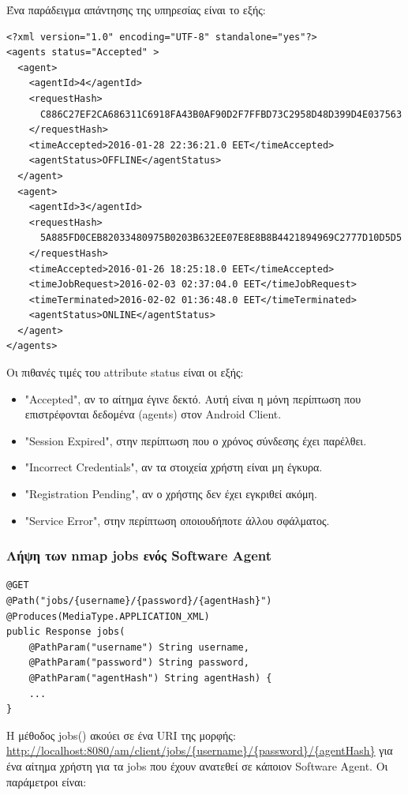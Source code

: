 \documentclass[a4paper,11pt]{article}
\begin{document}
\begin{sloppypar}
\begin{itemize}
\end{itemize}
Ένα παράδειγμα απάντησης της υπηρεσίας είναι το εξής:
\newpage


\begin{lstlisting}
<?xml version="1.0" encoding="UTF-8" standalone="yes"?>
<agents status="Accepted" >
  <agent>
    <agentId>4</agentId>
    <requestHash>
      C886C27EF2CA686311C6918FA43B0AF90D2F7FFBD73C2958D48D399D4E037563
    </requestHash>
    <timeAccepted>2016-01-28 22:36:21.0 EET</timeAccepted>
    <agentStatus>OFFLINE</agentStatus>
  </agent>
  <agent>
    <agentId>3</agentId>
    <requestHash>
      5A885FD0CEB82033480975B0203B632EE07E8E8B8B4421894969C2777D10D5D5
    </requestHash>
    <timeAccepted>2016-01-26 18:25:18.0 EET</timeAccepted>
    <timeJobRequest>2016-02-03 02:37:04.0 EET</timeJobRequest>
    <timeTerminated>2016-02-02 01:36:48.0 EET</timeTerminated>
    <agentStatus>ONLINE</agentStatus>
  </agent>
</agents>
\end{lstlisting}
Οι πιθανές τιμές του attribute status είναι οι εξής:
\begin{itemize}
\item "Accepted", αν το αίτημα έγινε δεκτό. Αυτή είναι η μόνη περίπτωση που επιστρέφονται δεδομένα (agents) στον Android Client.
\item "Session Expired", στην περίπτωση που ο χρόνος σύνδεσης έχει παρέλθει.
\item "Incorrect Credentials", αν τα στοιχεία χρήστη είναι μη έγκυρα.
\item "Registration Pending", αν ο χρήστης δεν έχει εγκριθεί ακόμη.
\item "Service Error", στην περίπτωση οποιουδήποτε άλλου σφάλματος.
\end{itemize}

\subsubsection{Λήψη των nmap jobs ενός Software Agent}
\begin{lstlisting}
@GET
@Path("jobs/{username}/{password}/{agentHash}")
@Produces(MediaType.APPLICATION_XML)
public Response jobs(
    @PathParam("username") String username,
    @PathParam("password") String password,
    @PathParam("agentHash") String agentHash) {
    ...
}
\end{lstlisting}
Η μέθοδος jobs() ακούει σε ένα URI της μορφής: \url{http://localhost:8080/am/client/jobs/{username}/{password}/{agentHash}} για ένα αίτημα χρήστη για τα jobs που έχουν ανατεθεί σε κάποιον Software Agent. Οι παράμετροι είναι:


\end{sloppypar}
\end{document}
